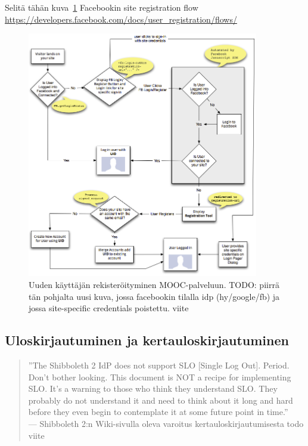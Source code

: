 \documentclass[finnish,gradu]{tktltiki}
\begin{document}
  Selitä tähän kuva~\ref{fig:registration_with_facebook} Facebookin site registration flow \url{https://developers.facebook.com/docs/user_registration/flows/}

  \begin{figure}
    \centering
    \includegraphics[width=0.9\textwidth]{images/facebook_user_registretion.png}
    \caption{Uuden käyttäjän rekisteröityminen MOOC-palveluun. TODO: piirrä tän pohjalta uusi kuva, jossa facebookin tilalla idp (hy/google/fb) ja jossa site-specific credentials poistettu. viite }
    \label{fig:registration_with_facebook}
  \end{figure}



  \subsection{Uloskirjautuminen ja kertauloskirjautuminen} %
  \label{sub:kertauloskirjautuminen}
    \begin{quote}
      ''The Shibboleth 2 IdP does not support SLO [Single Log Out]. Period. Don't bother looking. This document is NOT a recipe for implementing SLO. It's a warning to those who think they understand SLO. They probably do not understand it and need to think about it long and hard before they even begin to contemplate it at some future point in time.''
    \\--- Shibboleth 2:n Wiki-sivulla oleva varoitus kertauloskirjautumisesta  todo viite
    \end{quote}
\end{document}
